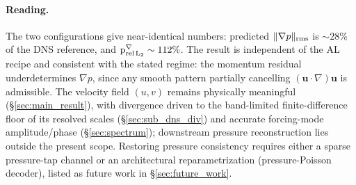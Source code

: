 \paragraph{Reading.}
The two configurations give near-identical numbers: predicted $\Vert\nabla p\Vert_{\rm rms}$ is $\sim 28\%$ of the DNS reference, and $\mathrm{p}^{\nabla}_{\rm rel\,L_2}\sim 112\%$. The result is independent of the AL recipe and consistent with the stated regime: the momentum residual underdetermines $\nabla p$, since any smooth pattern partially cancelling $(\mathbf{u}\cdot\nabla)\mathbf{u}$ is admissible. The velocity field $(u,v)$ remains physically meaningful (\S\ref{sec:main_result}), with divergence driven to the band-limited finite-difference floor of its resolved scales (\S\ref{sec:sub_dns_div}) and accurate forcing-mode amplitude/phase (\S\ref{sec:spectrum}); downstream pressure reconstruction lies outside the present scope. Restoring pressure consistency requires either a sparse pressure-tap channel or an architectural reparametrization (pressure-Poisson decoder), listed as future work in \S\ref{sec:future_work}.
